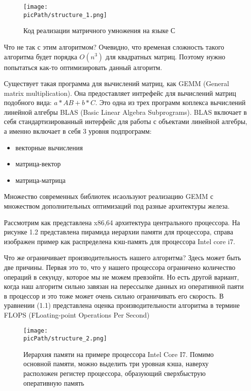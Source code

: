 \documentclass[oneside,final,12pt]{extreport}
\newcommand{\picPath}{images}
\begin{document}
\begin{figure}
\begin{center}
  \texttt{[image: \\picPath/structure\_1.png]}
  \caption{Код реализации матричного умножения на языке С}
  \label{fig:structure_1}
  \end{center}
\end{figure}

Что не так с этим алгоритмом? Очевидно, что временая сложность такого алгоритма будет порядка $O(n^3)$ для квадратных матриц. Поэтому нужно попытаться как-то оптимизировать данный алгоритм. 

Существует такая программа для вычислений матриц, как GEMM (General matrix multiplication). Она предоставляет  интрефейс для вычислений матриц подобного вида: $a*AB + b*C$. Это одна из трех программ коплекса вычислений линейной алгебры BLAS (Basic Linear Algebra Subprograms). BLAS включает в себя стандартизированный интерфейс для работы с объектами линейной алгебры, а именно включает в себя 3 уровня подпрограмм:

\begin{itemize}
\item векторные вычисления
\item матрица-вектор
\item матрица-матрица
\end{itemize}

Множество современных библиотек исаользуют реализацию GEMM с множеством дополнительных оптимизаций под разные архитектуры железа. 

Рассмотрим как представлена x86,64 архитектура центрального процессора. На рисунке 1.2 представлена пирамида иерархии памяти для процессора, справа изображен пример как распределена кэш-память для процессора Intel core i7.

Что же ограничивает производительность нашего алгоритма? Здесь может быть две причины. Первая это то, что у нашего процессора ограничено количество операций в секунду, которое мы не можем превзойти. Но есть другой вариант, когда наш алгоритм сильно завязан на перессылке данных из оперативной паяти в процессор и это тоже может очень сильно ограничивать его скорость. В уравнении (1.1) представлена оценка производительности алгоритма в термине FLOPS (FLoating-point Operations Per Second) 
\begin{figure}[H]
  \texttt{[image: \\picPath/structure\_2.png]}
  \caption{Иерархия памяти на примере процессора Intel Core I7. Помимо основной памяти, можно выделить три уровная кэша, наверху расположен регистер процессора, образующий сверхбыструю оперативную память}
  \label{fig:structure_2}
\end{figure} 
\end{document}
